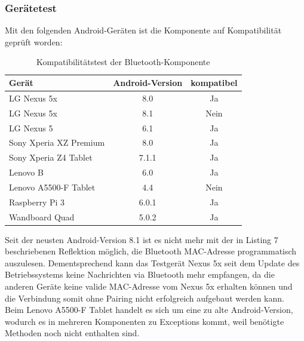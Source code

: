 \subsubsection{Gerätetest}
Mit den folgenden Android-Geräten ist die Komponente auf Kompatibilität geprüft worden:
\begin{table}[H]
	\begin{center}
		\begin{tabular}{l|c|c} 			
			Gerät & Android-Version & kompatibel \\
			\hline
			LG Nexus 5x & 8.0 & Ja\\
			LG Nexus 5x & 8.1 & Nein\\
			LG Nexus 5 & 6.1 & Ja\\
			Sony Xperia XZ Premium & 8.0 & Ja\\
			Sony Xperia Z4 Tablet & 7.1.1 & Ja\\
			Lenovo B & 6.0 & Ja\\
			Lenovo A5500-F Tablet & 4.4 & Nein\\
			Raspberry Pi 3 & 6.0.1 & Ja\\	
			Wandboard Quad & 5.0.2 & Ja\\			
		\end{tabular}
		\caption{Kompatibilitätstest der Bluetooth-Komponente}
		\label{tab:dimensions}
	\end{center}
\end{table}
Seit der neusten Android-Version 8.1 ist es nicht mehr mit der in Listing 7 beschriebenen Reflektion möglich, die Bluetooth MAC-Adresse programmatisch auszulesen. Dementsprechend kann das Testgerät Nexus 5x seit dem Update des Betriebssystems keine Nachrichten via Bluetooth mehr empfangen, da die anderen Geräte keine valide MAC-Adresse vom Nexus 5x erhalten können und die Verbindung somit ohne Pairing nicht erfolgreich aufgebaut werden kann. 
\\Beim Lenovo A5500-F Tablet handelt es sich um eine zu alte Android-Version, wodurch es in mehreren Komponenten zu Exceptions kommt, weil benötigte Methoden noch nicht enthalten sind.



